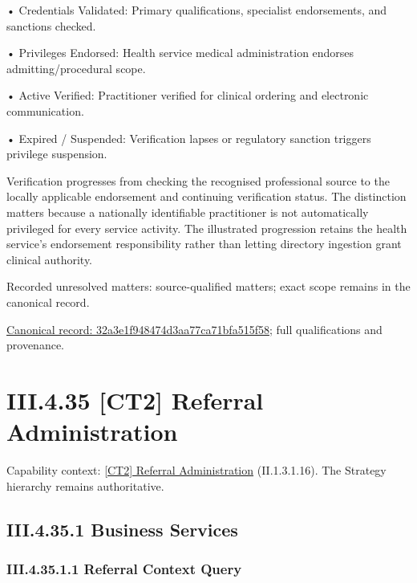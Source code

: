 •
Credentials Validated: Primary qualifications, specialist endorsements, and sanctions checked.



•
Privileges Endorsed: Health service medical administration endorses admitting/procedural scope.



•
Active Verified: Practitioner verified for clinical ordering and electronic communication.



•
Expired / Suspended: Verification lapses or regulatory sanction triggers privilege suspension.



Verification progresses from checking the recognised professional source to the locally applicable endorsement and continuing verification status. The distinction matters because a nationally identifiable practitioner is not automatically privileged for every service activity. The illustrated progression retains the health service's endorsement responsibility rather than letting directory ingestion grant clinical authority.


{\small Recorded unresolved matters: source-qualified matters; exact scope remains in the canonical record.}\par
{\footnotesize \href{../../../../continuum/business/business-process/32a3e1f948474d3aa77ca71bfa515f58.md}{Canonical record: 32a3e1f948474d3aa77ca71bfa515f58}; full qualifications and provenance.}\par
\section*{III.4.35 [CT2] Referral Administration}
\label{navigation:III.4.35}

{\small Capability context: \hyperref[element:ae0de25600ee416aa24d2a167b64f230]{[CT2] Referral Administration} (II.1.3.1.16). The Strategy hierarchy remains authoritative.}\par
\subsection*{III.4.35.1 Business Services}
\label{navigation:III.4.35.1}

\subsubsection*{III.4.35.1.1 Referral Context Query}
\label{navigation:III.4.35.1.1}

